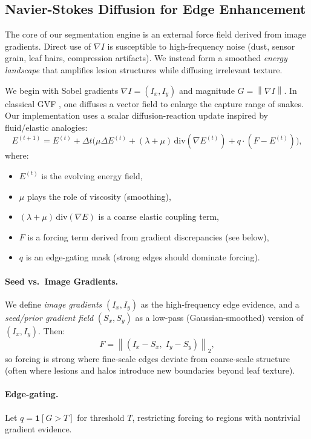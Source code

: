 \documentclass[journal]{IEEEtran}
\newcommand{\grad}{\nabla}
\newcommand{\lap}{\Delta}
\newcommand{\norm}[1]{\left\lVert #1 \right\rVert}
\begin{document}
\subsection{Navier-Stokes Diffusion for Edge Enhancement}
The core of our segmentation engine is an external force field derived from image gradients. Direct use of $\grad I$ is susceptible to high-frequency noise (dust, sensor grain, leaf hairs, compression artifacts). We instead form a smoothed \emph{energy landscape} that amplifies lesion structures while diffusing irrelevant texture.

We begin with Sobel gradients $\grad I = (I_x, I_y)$ and magnitude $G = \norm{\grad I}$. In classical GVF \cite{xu1998gvf}, one diffuses a vector field to enlarge the capture range of snakes. Our implementation uses a scalar diffusion-reaction update inspired by fluid/elastic analogies:
\begin{equation}
E^{(t+1)} = E^{(t)} + \Delta t \Big( \mu \lap E^{(t)} + (\lambda+\mu)\,\mathrm{div}(\grad E^{(t)}) + q\cdot (F - E^{(t)}) \Big),
\label{eq:diffusion_update}
\end{equation}
where:
\begin{itemize}
    \item $E^{(t)}$ is the evolving energy field,
    \item $\mu$ plays the role of viscosity (smoothing),
    \item $(\lambda+\mu)\,\mathrm{div}(\grad E)$ is a coarse elastic coupling term,
    \item $F$ is a forcing term derived from gradient discrepancies (see below),
    \item $q$ is an edge-gating mask (strong edges should dominate forcing).
\end{itemize}

\paragraph{Seed vs.\ Image Gradients.}
We define \emph{image gradients} $(I_x,I_y)$ as the high-frequency edge evidence, and a \emph{seed/prior gradient field} $(S_x,S_y)$ as a low-pass (Gaussian-smoothed) version of $(I_x,I_y)$. Then:
\begin{equation}
F = \norm{(I_x-S_x,\; I_y-S_y)}_2,
\end{equation}
so forcing is strong where fine-scale edges deviate from coarse-scale structure (often where lesions and halos introduce new boundaries beyond leaf texture).

\paragraph{Edge-gating.}
Let $q = \mathbf{1}[G > T]$ for threshold $T$, restricting forcing to regions with nontrivial gradient evidence.
\end{document}
